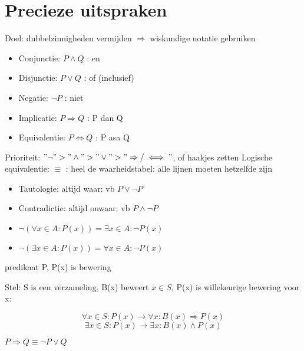 \documentclass{article}
\begin{document}
\section{Precieze uitspraken}
Doel: dubbelzinnigheden vermijden $\Rightarrow$ wiskundige notatie gebruiken
\begin{itemize}
    \item Conjunctie: $P \land Q$ : en
    \item Disjunctie: $P \lor Q$ : of (inclusief)
    \item Negatie: $\neg P$ : niet
    \item Implicatie: $P \Rightarrow Q$ : P dan Q
    \item Equivalentie: $P \iff Q$ : P asa Q
\end{itemize} 
Prioriteit: $"\neg" > "\land" > "\lor" > "\Rightarrow / \iff" $, of haakjes zetten \newline
Logische equivalentie: $\equiv$ : heel de waarheidstabel: alle lijnen moeten hetzelfde zijn
\begin{itemize}
    \item Tautologie: altijd waar: vb $P \lor \neg P$
    \item Contradictie: altijd onwaar: vb $P \land \neg P$
    \item $\neg (\forall x \in A: P(x)) = \exists x \in A: \neg P(x)$
    \item $\neg (\exists x \in A: P(x)) = \forall x \in A: \neg P(x)$
\end{itemize}
predikaat P, P(x) is bewering \newline

Stel: S is een verzameling, B(x) beweert $x \in S$, P(x) is willekeurige bewering voor x:

    \[\forall x \in S: P(x) \longrightarrow \forall x: B(x) \Rightarrow P(x)\]
    \[\exists x \in S: P(x) \longrightarrow \exists x: B(x) \land P(x)\]

$P \Rightarrow Q \equiv \neg P \lor Q$ \newline
\end{document}
